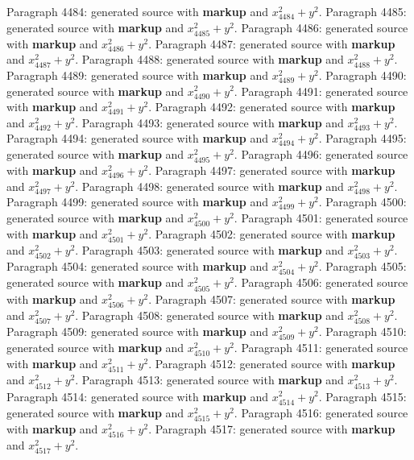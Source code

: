 \documentclass{article}
\begin{document}
Paragraph 4484: generated source with \textbf{markup} and $x_{4484}^2 + y^2$.
Paragraph 4485: generated source with \textbf{markup} and $x_{4485}^2 + y^2$.
Paragraph 4486: generated source with \textbf{markup} and $x_{4486}^2 + y^2$.
Paragraph 4487: generated source with \textbf{markup} and $x_{4487}^2 + y^2$.
Paragraph 4488: generated source with \textbf{markup} and $x_{4488}^2 + y^2$.
Paragraph 4489: generated source with \textbf{markup} and $x_{4489}^2 + y^2$.
Paragraph 4490: generated source with \textbf{markup} and $x_{4490}^2 + y^2$.
Paragraph 4491: generated source with \textbf{markup} and $x_{4491}^2 + y^2$.
Paragraph 4492: generated source with \textbf{markup} and $x_{4492}^2 + y^2$.
Paragraph 4493: generated source with \textbf{markup} and $x_{4493}^2 + y^2$.
Paragraph 4494: generated source with \textbf{markup} and $x_{4494}^2 + y^2$.
Paragraph 4495: generated source with \textbf{markup} and $x_{4495}^2 + y^2$.
Paragraph 4496: generated source with \textbf{markup} and $x_{4496}^2 + y^2$.
Paragraph 4497: generated source with \textbf{markup} and $x_{4497}^2 + y^2$.
Paragraph 4498: generated source with \textbf{markup} and $x_{4498}^2 + y^2$.
Paragraph 4499: generated source with \textbf{markup} and $x_{4499}^2 + y^2$.
Paragraph 4500: generated source with \textbf{markup} and $x_{4500}^2 + y^2$.
Paragraph 4501: generated source with \textbf{markup} and $x_{4501}^2 + y^2$.
Paragraph 4502: generated source with \textbf{markup} and $x_{4502}^2 + y^2$.
Paragraph 4503: generated source with \textbf{markup} and $x_{4503}^2 + y^2$.
Paragraph 4504: generated source with \textbf{markup} and $x_{4504}^2 + y^2$.
Paragraph 4505: generated source with \textbf{markup} and $x_{4505}^2 + y^2$.
Paragraph 4506: generated source with \textbf{markup} and $x_{4506}^2 + y^2$.
Paragraph 4507: generated source with \textbf{markup} and $x_{4507}^2 + y^2$.
Paragraph 4508: generated source with \textbf{markup} and $x_{4508}^2 + y^2$.
Paragraph 4509: generated source with \textbf{markup} and $x_{4509}^2 + y^2$.
Paragraph 4510: generated source with \textbf{markup} and $x_{4510}^2 + y^2$.
Paragraph 4511: generated source with \textbf{markup} and $x_{4511}^2 + y^2$.
Paragraph 4512: generated source with \textbf{markup} and $x_{4512}^2 + y^2$.
Paragraph 4513: generated source with \textbf{markup} and $x_{4513}^2 + y^2$.
Paragraph 4514: generated source with \textbf{markup} and $x_{4514}^2 + y^2$.
Paragraph 4515: generated source with \textbf{markup} and $x_{4515}^2 + y^2$.
Paragraph 4516: generated source with \textbf{markup} and $x_{4516}^2 + y^2$.
Paragraph 4517: generated source with \textbf{markup} and $x_{4517}^2 + y^2$.
\end{document}
